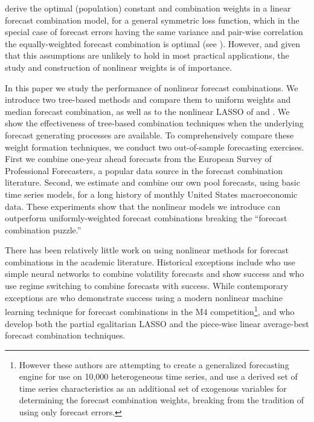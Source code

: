 \documentclass[12pt]{article}
\begin{document}

\cite{ElliotTimmermann2004} derive the optimal (population) constant and combination weights in a linear forecast combination model, for a general symmetric loss function, which in the special case of forecast errors having the same variance and pair-wise correlation the equally-weighted forecast combination is optimal (see \cite{timmermann2006forecast}). However, and given that this assumptions are unlikely to hold in most practical applications, the study and construction of nonlinear weights is of importance.

In this paper we study the performance of nonlinear forecast combinations. We introduce two tree-based methods and compare them to uniform weights and median forecast combination, as well as to the nonlinear LASSO of \cite{Conflitti2015} and \cite{DieboldShin2019}. We show the effectiveness of tree-based combination techniques when the underlying forecast generating processes are available. To comprehensively compare these weight formation techniques, we conduct two out-of-sample forecasting exercises. First we combine one-year ahead forecasts from the European Survey of Professional Forecasters, a popular data source in the forecast combination literature. Second, we estimate and combine our own pool forecasts, using basic time series models, for a long history of monthly United States macroeconomic data. These experiments show that the nonlinear models we introduce can outperform uniformly-weighted forecast combinations breaking the ``forecast combination puzzle.''

There has been relatively little work on using nonlinear methods for forecast combinations in the academic literature. Historical exceptions include \citet{DK1996} who use simple neural networks to combine volatility forecasts and show success and \cite{DEUTSCH1994} who use regime switching to combine forecasts with success. While  contemporary exceptions are \citet{MMAHT2018} who demonstrate success using a modern nonlinear machine learning technique for forecast combinations in the M4 competition\footnote{However these authors are attempting to create a generalized forecasting engine for use on 10,000 heterogeneous time series, and use a derived set of time series characteristics as an additional set of exogenous variables for determining the forecast combination weights, breaking from the tradition of using only forecast errors.}, and \cite{DieboldShin2019} who develop both the  partial egalitarian LASSO and the piece-wise linear average-best forecast combination techniques.
\end{document}

